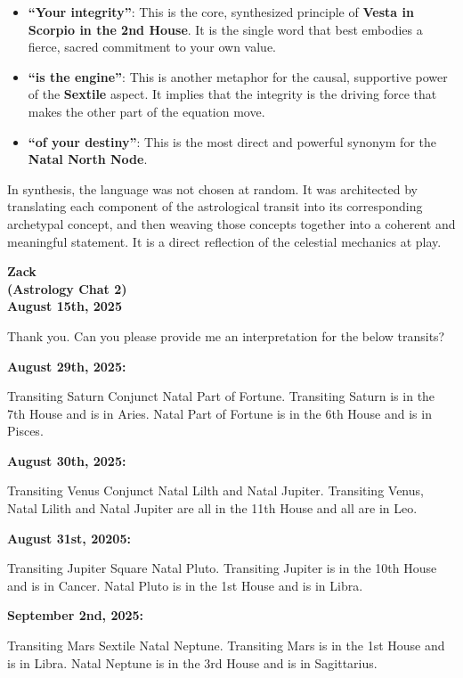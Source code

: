 \documentclass{article}
\begin{document}
\begin{itemize}
\item
  \textbf{``Your integrity''}: This is the core, synthesized principle of \textbf{Vesta in Scorpio in the 2nd House}. It is the single word that best embodies a fierce, sacred commitment to your own value.
\item
  \textbf{``is the engine''}: This is another metaphor for the causal, supportive power of the \textbf{Sextile} aspect. It implies that the integrity is the driving force that makes the other part of the equation move.
\item
  \textbf{``of your destiny''}: This is the most direct and powerful synonym for the \textbf{Natal North Node}.
\end{itemize}

In synthesis, the language was not chosen at random. It was architected by translating each component of the astrological transit into its corresponding archetypal concept, and then weaving those concepts together into a coherent and meaningful statement. It is a direct reflection of the celestial mechanics at play.


\begin{center}
\textbf{Zack} \\
\textbf{(Astrology Chat 2)} \\
\textbf{August 15th, 2025} 
\end{center}

Thank you. Can you please provide me an interpretation for the below transits?

\textbf{August 29th, 2025:}

Transiting Saturn Conjunct Natal Part of Fortune. Transiting Saturn is in the 7th House and is in Aries. Natal Part of Fortune is in the 6th House and is in Pisces.

\textbf{August 30th, 2025:}

Transiting Venus Conjunct Natal Lilth and Natal Jupiter. Transiting Venus, Natal Lilith and Natal Jupiter are all in the 11th House and all are in Leo.

\textbf{August 31st, 20205:}

Transiting Jupiter Square Natal Pluto. Transiting Jupiter is in the 10th House and is in Cancer. Natal Pluto is in the 1st House and is in Libra.

\textbf{September 2nd, 2025:}

Transiting Mars Sextile Natal Neptune. Transiting Mars is in the 1st House and is in Libra. Natal Neptune is in the 3rd House and is in Sagittarius.
\end{document}
